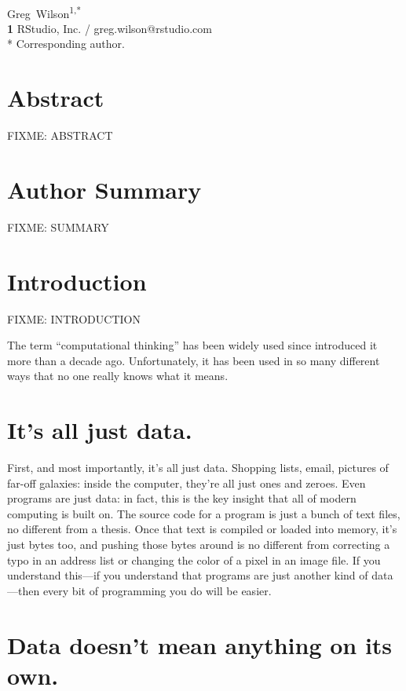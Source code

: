 \documentclass[10pt,letterpaper]{article}
\newcommand{\rulemajor}[1]{\section{#1}}
\begin{document}
\vspace*{0.2in}

\begin{flushleft}
{\Large
\textbf{}
}
\newline
\\
{Greg~Wilson}\textsuperscript{1,*}
\\
\textbf{1} RStudio, Inc. / greg.wilson@rstudio.com
\\
\bigskip
* Corresponding author.
\end{flushleft}

\section*{Abstract}

FIXME: ABSTRACT

\section*{Author Summary}

FIXME: SUMMARY

\section*{Introduction}

FIXME: INTRODUCTION

The term ``computational thinking'' has been widely used since \cite{Wing2006}
introduced it more than a decade ago.  Unfortunately, it has been used in so
many different ways that no one really knows what it means.

\rulemajor{It's all just data.}

First, and most importantly, it's all just data.  Shopping lists, email,
pictures of far-off galaxies: inside the computer, they're all just ones and
zeroes.  Even programs are just data: in fact, this is the key insight that all
of modern computing is built on.  The source code for a program is just a bunch
of text files, no different from a thesis.  Once that text is compiled or loaded
into memory, it's just bytes too, and pushing those bytes around is no different
from correcting a typo in an address list or changing the color of a pixel in an
image file.  If you understand this—if you understand that programs are just
another kind of data—then every bit of programming you do will be easier.

\rulemajor{Data doesn't mean anything on its own.}
\end{document}
